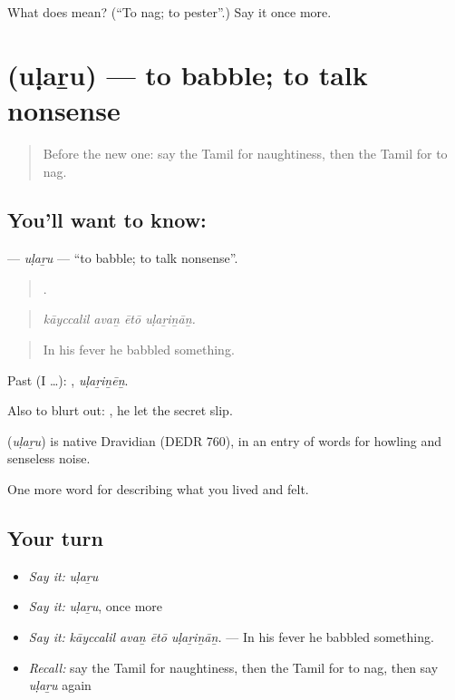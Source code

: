 \begin{tcolorbox}[breakable,colback=teal!4,colframe=teal!35!black,title={Before you move on}]
What does  mean? (\textquotedblleft{}To nag; to pester\textquotedblright{}.) Say it once more.
\end{tcolorbox}
\section[\texorpdfstring{\ta{உளறு} (uḷaṟu)}{உளறு (uḷaṟu)}]{ (uḷaṟu) — to babble; to talk nonsense}

\label{lesson:TA-C467-ularu}



\begin{quote}
Before the new one: say the Tamil for naughtiness, then the Tamil for to nag.
\end{quote}

\subsection*{You'll want to know: }
\textbf{} — \emph{uḷaṟu} — \textquotedblleft{}to babble; to talk nonsense\textquotedblright{}.

\begin{quote}
   .
\end{quote}

\begin{quote}
\emph{kāyccalil avaṉ ētō uḷaṟiṉāṉ.}
\end{quote}

\begin{quote}
In his fever he babbled something.
\end{quote}

Past (I …): , \emph{uḷaṟiṉēṉ}.

Also to blurt out:  , he let the secret slip.

\begin{cousinweb}
\textbf{} (\emph{uḷaṟu}) is native Dravidian (DEDR 760), in an entry of words for howling and senseless noise.
\end{cousinweb}

\begin{grammarlens}[title={What you've built}]
One more word for describing what you lived and felt.
\end{grammarlens}

\subsection*{Your turn}
\begin{itemize}
\raggedright
  \item \emph{Say it:} \emph{uḷaṟu}
  \item \emph{Say it:} \emph{uḷaṟu}, once more
  \item \emph{Say it:} \emph{kāyccalil avaṉ ētō uḷaṟiṉāṉ.} — In his fever he babbled something.
  \item \emph{Recall:} say the Tamil for naughtiness, then the Tamil for to nag, then say \emph{uḷaṟu} again
\end{itemize}

